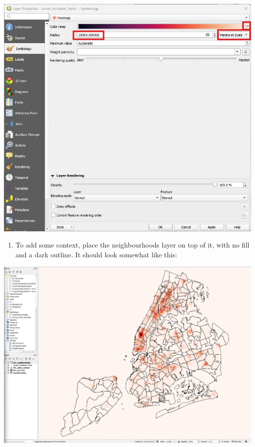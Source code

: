 \documentclass[
  letterpaper,
  DIV=11,
  numbers=noendperiod]{scrreprt}
\providecommand{\tightlist}{%
  \setlength{\itemsep}{0pt}\setlength{\parskip}{0pt}}\usepackage{longtable,booktabs,array}
\begin{document}
\includegraphics{images/lab_13/lab13_fig_heatmap_symbology.jpg}

\begin{enumerate}
\def\labelenumi{(\arabic{enumi})}
\setcounter{enumi}{331}
\tightlist
\item
  To add some context, place the neighbourhoods layer on top of it, with
  no fill and a dark outline. It should look somewhat like this:
\end{enumerate}

\includegraphics{images/lab_13/lab13_fig_heatmap_outcome_symb.jpg}
\end{document}

